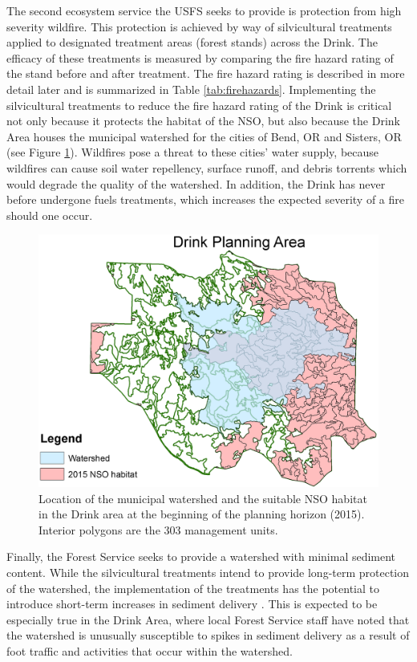 The second ecosystem service the USFS seeks to provide is protection from high severity wildfire. This protection is achieved by way of silvicultural treatments applied to designated treatment areas (forest stands) across the Drink. The efficacy of these treatments is measured by comparing the fire hazard rating of the stand before and after treatment. The fire hazard rating is described in more detail later and is summarized in Table \ref{tab:firehazards}. Implementing the silvicultural treatments to reduce the fire hazard rating of the Drink is critical not only because it protects the habitat of the NSO, but also because the Drink Area houses the municipal watershed for the cities of Bend, OR and Sisters, OR (see Figure \ref{fig:drinkOwlAndWatershed}). Wildfires pose a threat to these cities' water supply, because wildfires can cause soil water repellency, surface runoff, and debris torrents \cite{ice2004effects} which would degrade the quality of the watershed. In addition, the Drink has never before undergone fuels treatments, which increases the expected severity of a fire should one occur. 
\begin{figure}
\centering
\includegraphics[width=.5\textwidth]{../images/DrinkMap_NSOAndWatershed}
\caption[NSO Habitat and municipal watershed in the Drink Planning Area]{Location of the municipal watershed and the suitable NSO habitat in the Drink area at the beginning of the planning horizon (2015). Interior polygons are the 303 management units.}
\label{fig:drinkOwlAndWatershed}
\end{figure}

Finally, the Forest Service seeks to provide a watershed with minimal sediment content. While the silvicultural treatments intend to provide long-term protection of the watershed, the implementation of the treatments has the potential to introduce short-term increases in sediment delivery \cite{o2005conceptual}. This is expected to be especially true in the Drink Area, where local Forest Service staff have noted that the watershed is unusually susceptible to spikes in sediment delivery as a result of foot traffic and activities that occur within the watershed.

